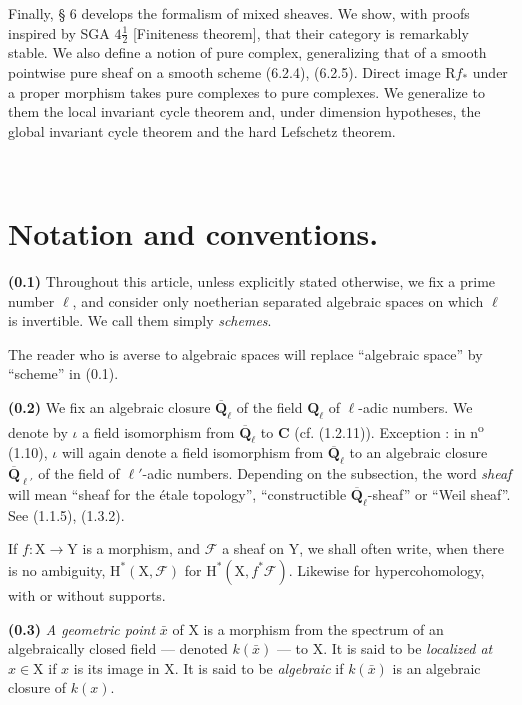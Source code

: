 \documentclass[11pt,leqno]{article}
\newcommand{\Page}[1]{\ifvmode\noindent\else\unskip\ \fi{\footnotesize\textcolor{gray}{[p.\,#1]}}\ \ignorespaces}
\begin{document}
Finally, § 6 develops the formalism of mixed sheaves. We show, with proofs inspired by SGA \(4\frac{1}{2}\) [Finiteness theorem], that their category is remarkably stable. We also define a notion of pure complex, generalizing that of a smooth pointwise pure sheaf on a smooth scheme (6.2.4), (6.2.5). Direct image \(\mathrm{R}f_*\) under a proper morphism takes pure complexes to pure complexes. We generalize to them the local invariant cycle theorem and, under dimension hypotheses, the global invariant cycle theorem and the hard Lefschetz theorem.

\Page{144}
\section*{Notation and conventions.}

\textbf{(0.1)} Throughout this article, unless explicitly stated otherwise, we fix a prime number \(\ell\), and consider only noetherian separated algebraic spaces on which \(\ell\) is invertible. We call them simply \textit{schemes}.

The reader who is averse to algebraic spaces will replace “algebraic space” by “scheme” in (0.1).

\textbf{(0.2)} We fix an algebraic closure \(\overline{\mathbf{Q}}_\ell\) of the field \(\mathbf{Q}_\ell\) of \(\ell\)-adic numbers. We denote by \(\iota\) a field isomorphism from \(\overline{\mathbf{Q}}_\ell\) to \(\mathbf{C}\) (cf. (1.2.11)). Exception : in n\textsuperscript{o} (1.10), \(\iota\) will again denote a field isomorphism from \(\overline{\mathbf{Q}}_\ell\) to an algebraic closure \(\overline{\mathbf{Q}}_{\ell'}\) of the field of \(\ell'\)-adic numbers. Depending on the subsection, the word \textit{sheaf} will mean “sheaf for the étale topology”, “constructible \(\overline{\mathbf{Q}}_\ell\)-sheaf” or “Weil sheaf”. See (1.1.5), (1.3.2).

If \(f:\mathrm{X}\to\mathrm{Y}\) is a morphism, and \(\mathscr{F}\) a sheaf on \(\mathrm{Y}\), we shall often write, when there is no ambiguity, \(\mathrm{H}^*(\mathrm{X},\mathscr{F})\) for \(\mathrm{H}^*(\mathrm{X},f^*\mathscr{F})\). Likewise for hypercohomology, with or without supports.

\textbf{(0.3)} \textit{A geometric point} \(\bar{x}\) of \(\mathrm{X}\) is a morphism from the spectrum of an algebraically closed field — denoted \(k(\bar{x})\) — to \(\mathrm{X}\). It is said to be \textit{localized at} \(x\in\mathrm{X}\) if \(x\) is its image in \(\mathrm{X}\). It is said to be \textit{algebraic} if \(k(\bar{x})\) is an algebraic closure of \(k(x)\).
\end{document}
